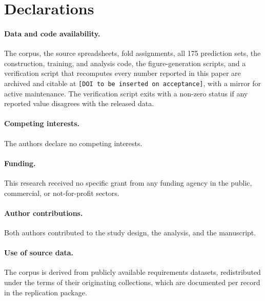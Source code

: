 \documentclass[11pt,a4paper]{article}
\begin{document}
\section*{Declarations}

\paragraph{Data and code availability.}
The corpus, the source spreadsheets, fold assignments, all 175 prediction sets, the
construction, training, and analysis code, the figure-generation scripts, and a verification
script that recomputes every number reported in this paper are archived and citable at
\texttt{[DOI to be inserted on acceptance]}, with a mirror for active maintenance. The verification script exits with a
non-zero status if any reported value disagrees with the released data.

\paragraph{Competing interests.}
The authors declare no competing interests.

\paragraph{Funding.}
This research received no specific grant from any funding agency in the public, commercial,
or not-for-profit sectors.

\paragraph{Author contributions.}
Both authors contributed to the study design, the analysis, and the manuscript.

\paragraph{Use of source data.}
The corpus is derived from publicly available requirements datasets, redistributed under
the terms of their originating collections, which are documented per record in the
replication package.
\end{document}

